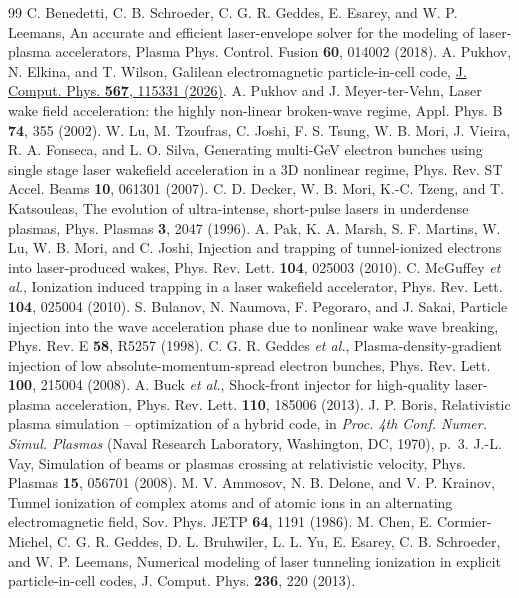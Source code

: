 \documentclass[aps,prab,reprint,floatfix,superscriptaddress,amsmath,amssymb]{revtex4-2}
\begin{document}
\begin{thebibliography}{99}
 C. Benedetti, C. B. Schroeder, C. G. R. Geddes, E. Esarey, and W. P. Leemans, An accurate and efficient laser-envelope solver for the modeling of laser-plasma accelerators, Plasma Phys. Control. Fusion \textbf{60}, 014002 (2018).
 A. Pukhov, N. Elkina, and T. Wilson, Galilean electromagnetic particle-in-cell code, \href{https://doi.org/10.1016/j.jcp.2026.115331}{J. Comput. Phys. \textbf{567}, 115331 (2026)}.
 A. Pukhov and J. Meyer-ter-Vehn, Laser wake field acceleration: the highly non-linear broken-wave regime, Appl. Phys. B \textbf{74}, 355 (2002).
 W. Lu, M. Tzoufras, C. Joshi, F. S. Tsung, W. B. Mori, J. Vieira, R. A. Fonseca, and L. O. Silva, Generating multi-GeV electron bunches using single stage laser wakefield acceleration in a 3D nonlinear regime, Phys. Rev. ST Accel. Beams \textbf{10}, 061301 (2007).
 C. D. Decker, W. B. Mori, K.-C. Tzeng, and T. Katsouleas, The evolution of ultra-intense, short-pulse lasers in underdense plasmas, Phys. Plasmas \textbf{3}, 2047 (1996).
 A. Pak, K. A. Marsh, S. F. Martins, W. Lu, W. B. Mori, and C. Joshi, Injection and trapping of tunnel-ionized electrons into laser-produced wakes, Phys. Rev. Lett. \textbf{104}, 025003 (2010).
 C. McGuffey \textit{et al.}, Ionization induced trapping in a laser wakefield accelerator, Phys. Rev. Lett. \textbf{104}, 025004 (2010).
 S. Bulanov, N. Naumova, F. Pegoraro, and J. Sakai, Particle injection into the wave acceleration phase due to nonlinear wake wave breaking, Phys. Rev. E \textbf{58}, R5257 (1998).
 C. G. R. Geddes \textit{et al.}, Plasma-density-gradient injection of low absolute-momentum-spread electron bunches, Phys. Rev. Lett. \textbf{100}, 215004 (2008).
 A. Buck \textit{et al.}, Shock-front injector for high-quality laser-plasma acceleration, Phys. Rev. Lett. \textbf{110}, 185006 (2013).
 J. P. Boris, Relativistic plasma simulation -- optimization of a hybrid code, in \textit{Proc. 4th Conf. Numer. Simul. Plasmas} (Naval Research Laboratory, Washington, DC, 1970), p.~3.
 J.-L. Vay, Simulation of beams or plasmas crossing at relativistic velocity, Phys. Plasmas \textbf{15}, 056701 (2008).
 M. V. Ammosov, N. B. Delone, and V. P. Krainov, Tunnel ionization of complex atoms and of atomic ions in an alternating electromagnetic field, Sov. Phys. JETP \textbf{64}, 1191 (1986).
 M. Chen, E. Cormier-Michel, C. G. R. Geddes, D. L. Bruhwiler, L. L. Yu, E. Esarey, C. B. Schroeder, and W. P. Leemans, Numerical modeling of laser tunneling ionization in explicit particle-in-cell codes, J. Comput. Phys. \textbf{236}, 220 (2013).

\end{thebibliography}
\end{document}
